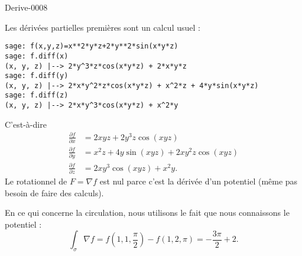
\begin{corrige}{Derive-0008}

    Les dérivées partielles premières sont un calcul usuel :
    \begin{verbatim}
sage: f(x,y,z)=x**2*y*z+2*y**2*sin(x*y*z)                                                                                                                   
sage: f.diff(x)
(x, y, z) |--> 2*y^3*z*cos(x*y*z) + 2*x*y*z
sage: f.diff(y)
(x, y, z) |--> 2*x*y^2*z*cos(x*y*z) + x^2*z + 4*y*sin(x*y*z)
sage: f.diff(z)
(x, y, z) |--> 2*x*y^3*cos(x*y*z) + x^2*y
    \end{verbatim}
    C'est-à-dire
    \begin{subequations}
        \begin{align}
            \frac{ \partial f }{ \partial x }&=2xyz+2y^3z\cos(xyz)\\
            \frac{ \partial f }{ \partial y }&=x^2z+4y\sin(xyz)+2xy^2z\cos(xyz)  \\
            \frac{ \partial f }{ \partial z }&=2xy^3\cos(xyz)+x^2y.
        \end{align}
    \end{subequations}
    Le rotationnel de \( F=\nabla f\) est nul parce c'est la dérivée d'un potentiel (même pas besoin de faire des calculs).

    En ce qui concerne la circulation, nous utilisons le fait que nous connaissons le potentiel :
    \begin{equation}
        \int_{\sigma}\nabla f=f(1,1,\frac{ \pi }{2})-f(1,2,\pi)=-\frac{ 3\pi }{2}+2.
    \end{equation}

\end{corrige}
